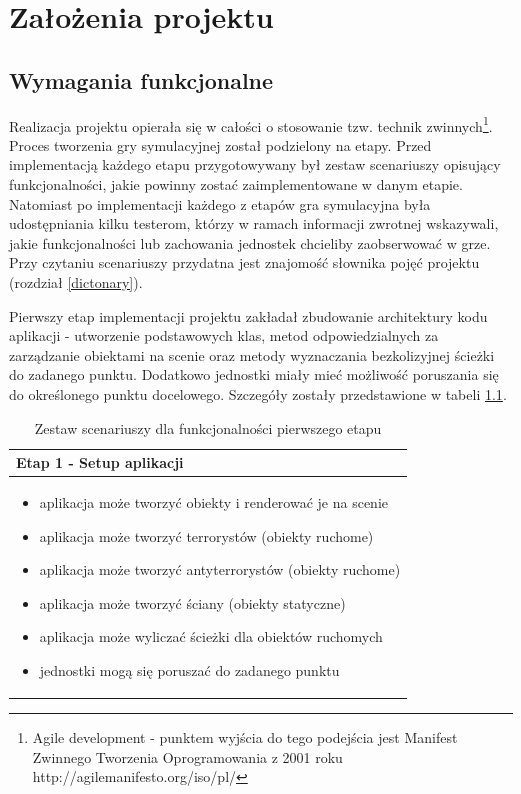 \chapter{Założenia projektu}
\section{Wymagania funkcjonalne}
Realizacja projektu opierała się w całości o stosowanie tzw. technik zwinnych\footnote{Agile development - punktem wyjścia do tego podejścia jest Manifest Zwinnego Tworzenia Oprogramowania z 2001 roku http://agilemanifesto.org/iso/pl/}. Proces tworzenia gry symulacyjnej został podzielony na etapy. Przed implementacją każdego etapu przygotowywany był zestaw scenariuszy opisujący funkcjonalności, jakie powinny zostać zaimplementowane w danym etapie. Natomiast po implementacji każdego z etapów gra symulacyjna była udostępniania kilku testerom, którzy w ramach informacji zwrotnej wskazywali, jakie funkcjonalności lub zachowania jednostek chcieliby zaobserwować w grze. Przy czytaniu scenariuszy przydatna jest znajomość słownika pojęć projektu (rozdział \ref{dictonary}).

Pierwszy etap implementacji projektu zakładał zbudowanie architektury kodu aplikacji - utworzenie podstawowych klas, metod odpowiedzialnych za zarządzanie obiektami na scenie oraz metody wyznaczania bezkolizyjnej ścieżki do zadanego punktu. Dodatkowo jednostki miały mieć możliwość poruszania się do określonego punktu docelowego. Szczegóły zostały przedstawione w tabeli \ref{scenarios1}.

\begin{table}
\begin{center}
\begin{tabular}{|p{}|}
\hline
Etap 1 - Setup aplikacji\\\hline
	\begin{itemize}
		\setlength\itemsep{0pt}
		\item aplikacja może tworzyć obiekty i renderować je na scenie
		\item aplikacja może tworzyć terrorystów (obiekty ruchome)
		\item aplikacja może tworzyć antyterrorystów (obiekty ruchome)
		\item aplikacja może tworzyć ściany (obiekty statyczne)
		\item aplikacja może wyliczać ścieżki dla obiektów ruchomych
		\item jednostki mogą się poruszać do zadanego punktu	
	\end{itemize}
\\\hline
\end{tabular}
\caption {Zestaw scenariuszy dla funkcjonalności pierwszego etapu\label{scenarios1}}
\end{center}
\end{table} 

